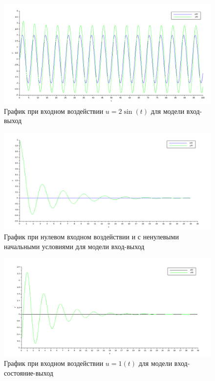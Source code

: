 \documentclass[12pt, a4paper] {ncc}
\begin{document}
		\begin{figure}[ht!]
    		\includegraphics[scale=0.4]{./plotiosin.png}
			\caption{График при входном воздействии $u = 2\sin(t)$ для модели вход-выход}
		\end{figure}

		\begin{figure}[ht!]
    		\includegraphics[scale=0.4]{./plotiofree.png}
			\caption{График при нулевом входном воздействии и с ненулевыми начальными условиями для модели вход-выход}
		\end{figure}

		\begin{figure}[ht]
    		\includegraphics[scale=0.4]{./plotios1t.png}
			\caption{График при входном воздействии $u = 1(t)$ для модели вход-состояние-выход}
		\end{figure}
\end{document}
